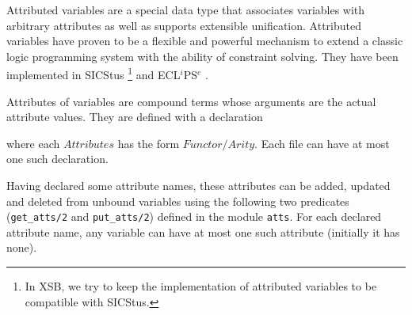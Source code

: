 Attributed variables are a special data type that associates variables
with arbitrary attributes as well as supports extensible unification.
Attributed variables have proven to be a flexible and powerful mechanism
to extend a classic logic programming system with the ability of
constraint solving.  They have been implemented in SICStus \footnote{In
  XSB, we try to keep the implementation of attributed variables to be
  compatible with SICStus.} \cite{sicstus-manual} and ECL$^i$PS$^e$
\cite{eclipse-manual}.

Attributes of variables are compound terms whose arguments are the
actual attribute values.  They are defined with a declaration


\noindent where each $Attributes$ has the form $Functor/Arity$.  Each
file can have at most one such declaration.

Having declared some attribute names, these attributes can be added,
updated and deleted from unbound variables using the following two
predicates (\texttt{get\_atts/2} and \texttt{put\_atts/2}) defined in
the module \texttt{atts}.  For each declared attribute name, any
variable can have at most one such attribute (initially it has none).

